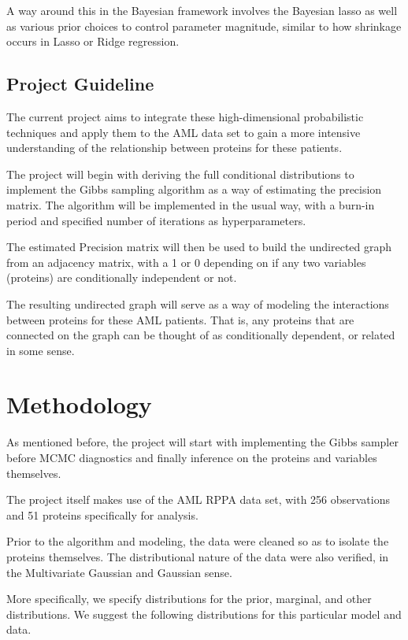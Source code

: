 \documentclass{article}
\begin{document}
A way around this in the Bayesian framework involves the Bayesian lasso as well as various prior choices to control parameter magnitude, similar to how shrinkage occurs in Lasso or Ridge regression. 


\subsection{Project Guideline}

The current project aims to integrate these high-dimensional probabilistic techniques and apply them to the AML data set to gain a more intensive understanding of the relationship between proteins for these patients. 

The project will begin with deriving the full conditional distributions to implement the Gibbs sampling algorithm as a way of estimating the precision matrix. The algorithm will be implemented in the usual way, with a burn-in period and specified number of iterations as hyperparameters. 

The estimated Precision matrix will then be used to build the undirected graph from an adjacency matrix, with a 1 or 0 depending on if any two variables (proteins) are conditionally independent or not. 

The resulting undirected graph will serve as a way of modeling the interactions between proteins for these AML patients. That is, any proteins that are connected on the graph can be thought of as conditionally dependent, or related in some sense. 

\section{Methodology}
\label{gen_inst}

As mentioned before, the project will start with implementing the Gibbs sampler before MCMC diagnostics and finally inference on the proteins and variables themselves. 

The project itself makes use of the AML RPPA data set, with 256 observations and 51 proteins specifically for analysis. 

Prior to the algorithm and modeling, the data were cleaned so as to isolate the proteins themselves. The distributional nature of the data were also verified, in the Multivariate Gaussian and Gaussian sense. 

More specifically, we specify distributions for the prior, marginal, and other distributions. We suggest the following distributions for this particular model and data. 
\end{document}
